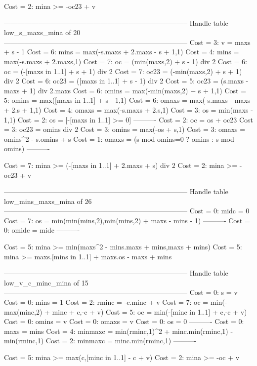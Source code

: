 Cost =  2:  mina >= -oc23 + v

--------------------------------------------------------------------------------
Handle table low_s_maxs_mina of 20
--------------------------------------------------------------------------------
Cost =  3:  v     = maxs + s - 1
Cost =  6:  mins  = max(-s.maxs + 2.maxs - s + 1,1)
Cost =  4:  mins  = max(-s.maxs + 2.maxs,1)
Cost =  7:  oc    = (min(maxs,2) + s - 1) div 2
Cost =  6:  oc    = (-[maxs in 1..1] + s + 1) div 2
Cost =  7:  oc23  = (-min(maxs,2) + s + 1) div 2
Cost =  6:  oc23  = ([maxs in 1..1] + s - 1) div 2
Cost =  5:  oc23  = (s.maxs - maxs + 1) div 2.maxs
Cost =  6:  omins = max(-min(maxs,2) + s + 1,1)
Cost =  5:  omins = max([maxs in 1..1] + s - 1,1)
Cost =  6:  omaxs = max(-s.maxs - maxs + 2.s + 1,1)
Cost =  4:  omaxs = max(-s.maxs + 2.s,1)
Cost =  3:  os    = min(maxs - 1,1)
Cost =  2:  os    = [-[maxs in 1..1] >= 0]
----------
Cost =  2:  oc    = os + oc23
Cost =  3:  oc23  = omins div 2
Cost =  3:  omins = max(-os + s,1)
Cost =  3:  omaxs = omins^2 - s.omins + s
Cost =  1:  omaxs = (s mod omins=0 ? omins : s mod omins)
----------

Cost =  7:  mina >= (-[maxs in 1..1] + 2.maxs + s) div 2
Cost =  2:  mina >= -oc23 + v

--------------------------------------------------------------------------------
Handle table low_mins_maxs_mina of 26
--------------------------------------------------------------------------------
Cost =  0:  midc  = 0
Cost =  7:  os    = min(min(mins,2),min(mins,2) + maxs - mins - 1)
----------
Cost =  0:  omidc = midc
----------

Cost =  5:  mina >= min(maxs^2 - mins.maxs + mins,maxs + mins)
Cost =  5:  mina >= maxs.[mins in 1..1] + maxs.os - maxs + mins

--------------------------------------------------------------------------------
Handle table low_v_c_minc_mina of 15
--------------------------------------------------------------------------------
Cost =  0:  s       = v
Cost =  0:  mins    = 1
Cost =  2:  rminc   = -c.minc + v
Cost =  7:  oc      = min(-max(minc,2) + minc + c,-c + v)
Cost =  5:  oc      = min(-[minc in 1..1] + c,-c + v)
Cost =  0:  omins   = v
Cost =  0:  omaxs   = v
Cost =  0:  os      = 0
----------
Cost =  0:  maxs    = mins
Cost =  4:  minmaxc = min(rminc,1)^2 + minc.min(rminc,1) - min(rminc,1)
Cost =  2:  minmaxc = minc.min(rminc,1)
----------

Cost =  5:  mina >= max(c,[minc in 1..1] - c + v)
Cost =  2:  mina >= -oc + v


